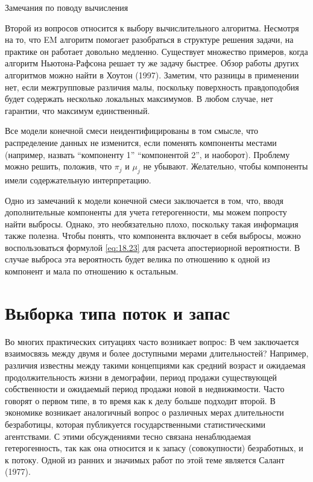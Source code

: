         \begin{center}{Замечания по поводу вычисления}\end{center}
        \noindent
Второй из вопросов относится к выбору вычислительного алгоритма. Несмотря на то, что EM алгоритм помогает разобраться в структуре решения задачи, на практике он работает довольно медленно. Существует множество примеров, когда алгоритм Ньютона-Рафсона решает ту же задачу быстрее. Обзор работы других алгоритмов можно найти в Хоутон (1997). Заметим, что разницы в применении нет, если межгрупповые различия малы, поскольку поверхность правдоподобия будет содержать несколько локальных максимумов. В любом случае, нет гарантии, что максимум единственный.

Все модели конечной смеси неидентифицированы в том смысле, что распределение данных не изменится, если поменять компоненты местами (например, назвать ``компоненту 1'' ``компонентой 2'', и наоборот). Проблему можно решить, положив, что $\pi_j$ и $\mu_j$ не убывают. Желательно, чтобы компоненты имели содержательную интерпретацию.

Одно из замечаний к модели конечной смеси заключается в том, что, вводя дополнительные компоненты для учета гетерогенности, мы можем попросту найти выбросы. Однако, это необязательно плохо, поскольку такая информация также полезна. Чтобы понять, что компонента включает в себя выбросы, можно воспользоваться формулой \ref{eq:18.23} для расчета апостериорной вероятности. В случае выброса эта вероятность будет велика по отношению к одной из компонент и мала по отношению к остальным.




\section{Выборка типа поток и запас}\label{sec:18.6}

\noindent
Во многих практических ситуациях часто возникает вопрос: В чем заключается взаимосвязь между двумя и более доступными мерами длительностей? Например, различия известны между такими концепциями как средний возраст и ожидаемая продолжительность жизни в демографии, период продажи существующей собственности и ожидаемый период продажи новой в недвижимости. Часто говорят о первом типе, в то время как к делу больше подходит второй. В экономике возникает аналогичный вопрос о различных мерах длительности безработицы, которая публикуется государственными статистическими агентствами. С этими обсуждениями тесно связана ненаблюдаемая гетерогенность, так как она относится и к запасу (совокупности) безработных, и к потоку. Одной из ранних и значимых работ по этой теме является Салант (1977).

